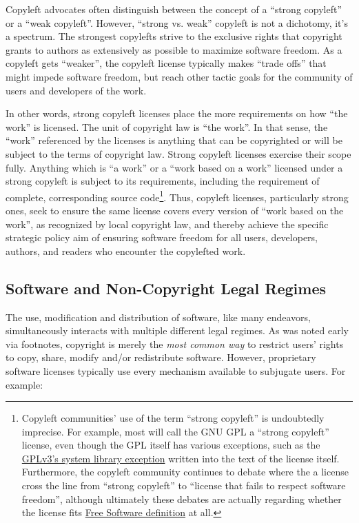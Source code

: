 Copyleft advocates often distinguish between the concept of a ``strong
copyleft'' or a ``weak copyleft''.  However, ``strong vs. weak'' copyleft is
not a dichotomy, it's a spectrum.  The strongest copylefts strive to the
exclusive rights that copyright  grants to authors as extensively as possible
to maximize software freedom.  As a copyleft gets ``weaker'', the copyleft
license typically makes ``trade offs'' that might impede software freedom,
but reach other tactic goals for the community of users and developers of the
work.

In other words, strong copyleft licenses place the more requirements on how
``the work'' is licensed.  The unit of copyright law is ``the work''.  In
that sense, the ``work'' referenced by the licenses is anything that can be
copyrighted or will be subject to the terms of copyright law.  Strong
copyleft licenses exercise their scope fully.  Anything which is ``a work''
or a ``work based on a work'' licensed under a strong copyleft is subject to
its requirements, including the requirement of complete, corresponding source
code\footnote{Copyleft communities' use of the term ``strong copyleft'' is
  undoubtedly imprecise.  For example, most will call the GNU GPL a ``strong
  copyleft'' license, even though the GPL itself has various exceptions, such
  as the \hyperref[GPLv3-system-library-exception]{GPLv3's system library
    exception} written into the text of the license itself.  Furthermore, the
  copyleft community continues to debate where the a license cross the line
  from ``strong copyleft'' to ``license that fails to respect software
  freedom'', although ultimately these debates are actually regarding whether
  the license fits \hyperref[Free Software Definition]{Free Software
    definition} at all.}.  Thus, copyleft licenses, particularly strong ones,
seek to ensure the same license covers every version of ``work based on the
work'', as recognized by local copyright law, and thereby achieve the
specific strategic policy aim of ensuring software freedom for all users,
developers, authors, and readers who encounter the copylefted work.

\subsection{Software and Non-Copyright Legal Regimes}
\label{software-and-non-copyright}

The use, modification and distribution of software, like many endeavors,
simultaneously interacts with multiple different legal regimes.  As was noted
early via footnotes, copyright is merely the \textit{most common way} to
restrict users' rights to copy, share, modify and/or redistribute software.
However, proprietary software licenses typically use every mechanism
available to subjugate users.  For example:

